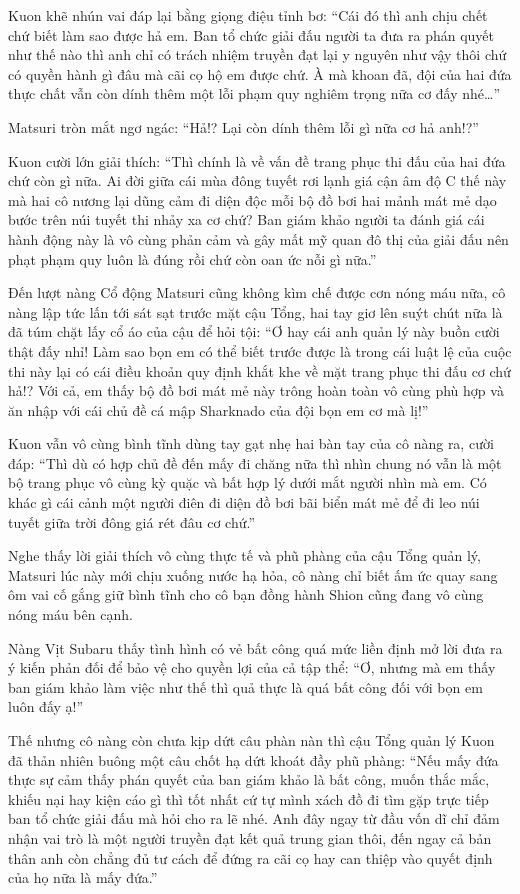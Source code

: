 \documentclass[../main.tex]{subfiles}
\begin{document}
Kuon khẽ nhún vai đáp lại bằng giọng điệu tỉnh bơ: ``Cái đó thì anh chịu chết chứ biết làm sao được hả em. Ban tổ chức giải đấu người ta đưa ra phán quyết như thế nào thì anh chỉ có trách nhiệm truyền đạt lại y nguyên như vậy thôi chứ có quyền hành gì đâu mà cãi cọ hộ em được chứ. À mà khoan đã, đội của hai đứa thực chất vẫn còn dính thêm một lỗi phạm quy nghiêm trọng nữa cơ đấy nhé\dots''

Matsuri tròn mắt ngơ ngác: ``Hả!? Lại còn dính thêm lỗi gì nữa cơ hả anh!?''

Kuon cười lớn giải thích: ``Thì chính là về vấn đề trang phục thi đấu của hai đứa chứ còn gì nữa. Ai đời giữa cái mùa đông tuyết rơi lạnh giá cận âm độ C thế này mà hai cô nương lại dũng cảm đi diện độc mỗi bộ đồ bơi hai mảnh mát mẻ dạo bước trên núi tuyết thi nhảy xa cơ chứ? Ban giám khảo người ta đánh giá cái hành động này là vô cùng phản cảm và gây mất mỹ quan đô thị của giải đấu nên phạt phạm quy luôn là đúng rồi chứ còn oan ức nỗi gì nữa.''

Đến lượt nàng Cổ động Matsuri cũng không kìm chế được cơn nóng máu nữa, cô nàng lập tức lấn tới sát sạt trước mặt cậu Tổng, hai tay giơ lên suýt chút nữa là đã túm chặt lấy cổ áo của cậu để hỏi tội: ``Ơ hay cái anh quản lý này buồn cười thật đấy nhỉ! Làm sao bọn em có thể biết trước được là trong cái luật lệ của cuộc thi này lại có cái điều khoản quy định khắt khe về mặt trang phục thi đấu cơ chứ hả!? Với cả, em thấy bộ đồ bơi mát mẻ này trông hoàn toàn vô cùng phù hợp và ăn nhập với cái chủ đề cá mập Sharknado của đội bọn em cơ mà lị!''

Kuon vẫn vô cùng bình tĩnh dùng tay gạt nhẹ hai bàn tay của cô nàng ra, cười đáp: ``Thì dù có hợp chủ đề đến mấy đi chăng nữa thì nhìn chung nó vẫn là một bộ trang phục vô cùng kỳ quặc và bất hợp lý dưới mắt người nhìn mà em. Có khác gì cái cảnh một người điên đi diện đồ bơi bãi biển mát mẻ để đi leo núi tuyết giữa trời đông giá rét đâu cơ chứ.''

Nghe thấy lời giải thích vô cùng thực tế và phũ phàng của cậu Tổng quản lý, Matsuri lúc này mới chịu xuống nước hạ hỏa, cô nàng chỉ biết ấm ức quay sang ôm vai cố gắng giữ bình tĩnh cho cô bạn đồng hành Shion cũng đang vô cùng nóng máu bên cạnh.

Nàng Vịt Subaru thấy tình hình có vẻ bất công quá mức liền định mở lời đưa ra ý kiến phản đối để bảo vệ cho quyền lợi của cả tập thể: ``Ơ, nhưng mà em thấy ban giám khảo làm việc như thế thì quả thực là quá bất công đối với bọn em luôn đấy ạ!''

Thế nhưng cô nàng còn chưa kịp dứt câu phàn nàn thì cậu Tổng quản lý Kuon đã thản nhiên buông một câu chốt hạ dứt khoát đầy phũ phàng: ``Nếu mấy đứa thực sự cảm thấy phán quyết của ban giám khảo là bất công, muốn thắc mắc, khiếu nại hay kiện cáo gì thì tốt nhất cứ tự mình xách đồ đi tìm gặp trực tiếp ban tổ chức giải đấu mà hỏi cho ra lẽ nhé. Anh đây ngay từ đầu vốn dĩ chỉ đảm nhận vai trò là một người truyền đạt kết quả trung gian thôi, đến ngay cả bản thân anh còn chẳng đủ tư cách để đứng ra cãi cọ hay can thiệp vào quyết định của họ nữa là mấy đứa.''
\end{document}
